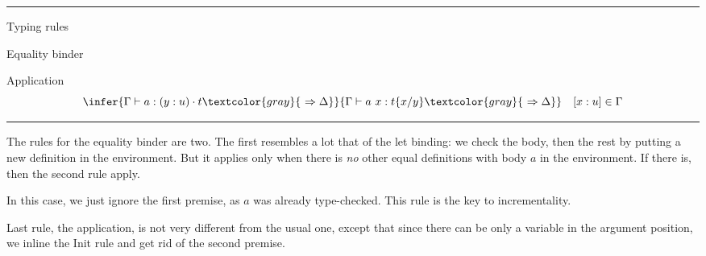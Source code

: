 \documentclass[ignorenonframetext,red]{beamer}
\begin{document}
\hrule
\begin{frame}{Typing rules}
  \begin{block}{Equality binder}
  \end{block}
  \pause
  \begin{block}{Application}
    \[ \infer
      {\Gamma\vdash a : (y:u)\cdot t \textcolor{gray}{\ \Rightarrow\Delta}}
      {\Gamma\vdash a\ x : t \{x/y\} \textcolor{gray}{\ \Rightarrow\Delta}}
      \quad [x : u] \in \Gamma
      \]
  \end{block}
\end{frame}
\hrule

The rules for the equality binder are two. The first resembles a lot
that of the \textsf{let} binding: we check the body, then the rest by
putting a new definition in the environment. But it applies only when
there is \emph{no} other equal definitions with body $a$ in the
environment. If there is, then the second rule apply.

In this case, we just ignore the first premise, as $a$ was already
type-checked. This rule is the key to incrementality.

Last rule, the application, is not very different from the usual one,
except that since there can be only a variable in the argument
position, we inline the Init rule and get rid of the second premise.
\end{document}
